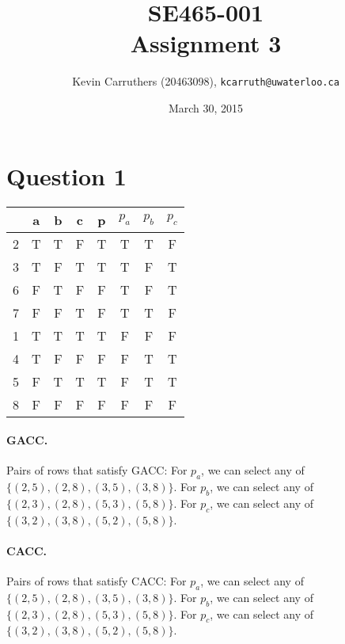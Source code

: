 \documentclass[12pt]{article}
\begin{document}
\title{SE465-001\\Assignment 3}
\author{Kevin Carruthers (20463098), {\tt kcarruth@uwaterloo.ca}}
\date{March 30, 2015}
\maketitle

\section*{Question 1}
\begin{table}[ht]
\centering
\begin{tabular}{|c|c|c|c||c||c|c|c|}
\hline
  & a & b & c & p & $p_a$ & $p_b$ & $p_c$ \\ \hline
2 & T & T & F & T & T     & T     & F     \\ \hline
3 & T & F & T & T & T     & F     & T     \\ \hline
6 & F & T & F & F & T     & F     & T     \\ \hline
7 & F & F & T & F & T     & T     & F     \\ \hline
1 & T & T & T & T & F     & F     & F     \\ \hline
4 & T & F & F & F & F     & T     & T     \\ \hline
5 & F & T & T & T & F     & T     & T     \\ \hline
8 & F & F & F & F & F     & F     & F     \\ \hline
\end{tabular}
\end{table}

\paragraph{GACC.} Pairs of rows that satisfy GACC: For $p_a$, we can select any of $\{(2, 5), (2, 8), (3, 5), (3, 8)\}$. For $p_b$, we can select any of $\{(2, 3), (2, 8), (5, 3), (5, 8)\}$. For $p_c$, we can select any of $\{(3, 2), (3, 8), (5, 2), (5, 8)\}$.
\paragraph{CACC.} Pairs of rows that satisfy CACC: For $p_a$, we can select any of $\{(2, 5), (2, 8), (3, 5), (3, 8)\}$. For $p_b$, we can select any of $\{(2, 3), (2, 8), (5, 3), (5, 8)\}$. For $p_c$, we can select any of $\{(3, 2), (3, 8), (5, 2), (5, 8)\}$.
\end{document}
